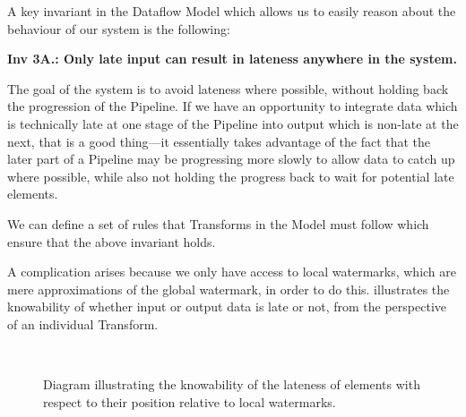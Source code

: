 A key invariant in the Dataflow Model which allows us to easily reason about the behaviour of our system is the following:


\textbf{Inv 3A.: Only late input can result in lateness anywhere in the system.}

The goal of the system is to avoid lateness where possible, without holding back the progression of the Pipeline.
If we have an opportunity to integrate data which is technically late at one stage of the Pipeline into output which is non-late at the next, that is a good thing---it essentially takes advantage of the fact that the later part of a Pipeline may be progressing more slowly to allow data to catch up where possible, while also not holding the progress back to wait for potential late elements.

We can define a set of rules that Transforms in the Model must follow which ensure that the above invariant holds.

A complication arises because we only have access to local watermarks, which are mere approximations of the global watermark, in order to do this.
 illustrates the knowability of whether input or output data is late or not, from the perspective of an individual Transform.

\begin{figure}[t]
	\\
	\caption{Diagram illustrating the knowability of the lateness of elements with respect to their position relative to local watermarks.}
	\label{fig:impl:lateness-knowability}
\end{figure}


